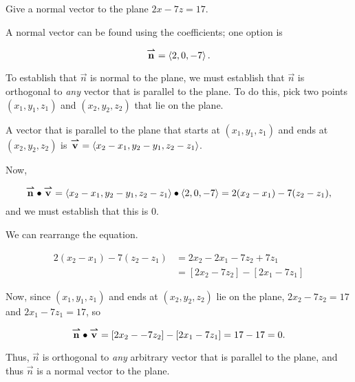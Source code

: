 \documentclass[noauthor]{ximera}
\begin{document}
\begin{problem}
Give a normal vector to the plane $2x-7z=17$.

\begin{freeResponse}
A normal vector can be found using the coefficients; one option is

\[
{\overset{\boldsymbol{\rightharpoonup}}{\mathbf{n}}} = \left\langle 2,0,-7\right\rangle.
\]

\begin{remark}
To establish that $\vec{n}$ is normal to the plane, we must establish that $\vec{n}$ is orthogonal to \emph{any} vector that is parallel to the plane. To do this, pick two points $(x_1,y_1,z_1)$ and $(x_2,y_2,z_2)$ that lie on the plane.

A vector that is parallel to the plane that starts at $(x_1,y_1,z_1)$ and ends at $(x_2,y_2,z_2)$ is ${\overset{\boldsymbol{\rightharpoonup}}{\mathbf{v}}} = \left\langle x_2-x_1,y_2-y_1,z_2-z_1\right\rangle$.

Now, 

\[{\overset{\boldsymbol{\rightharpoonup}}{\mathbf{n}}} \bullet {\overset{\boldsymbol{\rightharpoonup}}{\mathbf{v}}} = \left\langle x_2-x_1,y_2-y_1,z_2-z_1\right\rangle \bullet \left\langle 2,0,-7\right\rangle = 2(x_2-x_1) -7(z_2-z_1),\] and we must establish that this is $0$.

We can rearrange the equation.

\begin{align*}
2(x_2-x_1) -7(z_2-z_1) &= 2x_2-2x_1-7z_2+7z_1 \\
&= \left[2x_2 -7z_2\right]-\left[2x_1 -7z_1\right]
\end{align*}

Now, since $(x_1,y_1,z_1)$ and ends at $(x_2,y_2,z_2)$  lie on the plane, $2x_2 -7z_2 = 17$ and $2x_1 -7z_1 = 17$, so 

\[
{\overset{\boldsymbol{\rightharpoonup}}{\mathbf{n}}} \bullet {\overset{\boldsymbol{\rightharpoonup}}{\mathbf{v}}} = \left[2x_2 --7z_2\right]-\left[2x_1 -7z_1\right] = 17-17 = 0.
\]

Thus, $\vec{n}$ is orthogonal to \emph{any} arbitrary vector that is parallel to the plane, and thus $\vec{n}$ is a normal vector to the plane.





\end{remark}
\end{freeResponse}
\end{problem}
\end{document}
